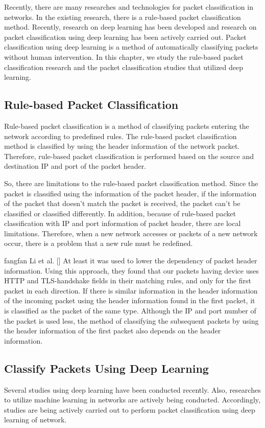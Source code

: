 Recently, there are many researches and technologies for packet classification in networks.
In the existing research, there is a rule-based packet classification method.
Recently, research on deep learning has been developed and research on packet classification using deep learning has been actively carried out.
Packet classification using deep learning is a method of automatically classifying packets without human intervention.
In this chapter, we study the rule-based packet classification research and the packet classification studies that utilized deep learning.

\subsection{Rule-based Packet Classification}\label{subsec:rule-basedPacketClassification}
Rule-based packet classification is a method of classifying packets entering the network according to predefined rules.
The rule-based packet classification method is classified by using the header information of the network packet.
Therefore, rule-based packet classification is performed based on the source and destination IP and port of the packet header.

So, there are limitations to the rule-based packet classification method.
Since the packet is classified using the information of the packet header, if the information of the packet that doesn't match the packet is received, the packet can't be classified or classified differently.
In addition, because of rule-based packet classification with IP and port information of packet header, there are local limitations.
Therefore, when a new network accesses or packets of a new network occur, there is a problem that a new rule must be redefined.

fangfan Li et al. [] At least it was used to lower the dependency of packet header information.
Using this approach, they found that our packets having device uses HTTP and TLS-handshake fields in their matching rules, and only for the first packet in each direction.
If there is similar information in the header information of the incoming packet using the header information found in the first packet, it is classified as the packet of the same type.
Although the IP and port number of the packet is used less, the method of classifying the subsequent packets by using the header information of the first packet also depends on the header information.

\subsection{Classify Packets Using Deep Learning}\label{subsec:classifyPacketsUsingDeepLearning}
Several studies using deep learning have been conducted recently.
Also, researches to utilize machine learning in networks are actively being conducted.
Accordingly, studies are being actively carried out to perform packet classification using deep learning of network.

